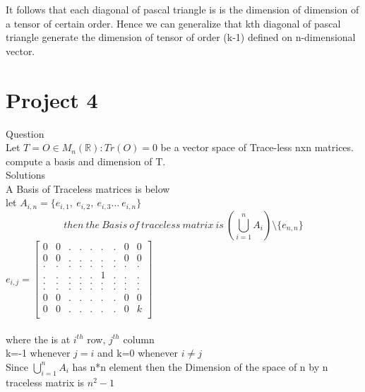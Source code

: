 \documentclass[45pt]{article}
\begin{document}
It follows that each diagonal of pascal triangle is is the dimension of dimension of a tensor of certain order. 
Hence we can generalize that kth diagonal of pascal triangle generate the dimension of tensor of order (k-1) defined on n-dimensional vector.
\vspace{6.0cm}

\section*{\Huge{Project 4}}
\Large{Question}\\
Let $T={O \in M_n(\mathbb{R}) :Tr(O)=0 }$ be a vector space of Trace-less nxn matrices. compute a basis and dimension of T.\\
    
\Large{Solutions}\\
A Basis of Traceless matrices is below\\
let $A_{i,n}=\{e_{i,1},~ e_{i,2},~e_{i,3}...~e_{i,n}\}$\\
$$then~ the ~Basis~of ~traceless ~matrix ~ is ~ ( \bigcup_{i=1}^{n} A_i) \setminus \{e_{n,n}\}   $$
 $e_{i,j}= \begin{bmatrix}
            0 &  0 &.&.&.& .& .& 0 &0\\
 0 &  0 &.&.&.& .& .& 0 &0\\
 .&.&.&.&.&.&.&.&.\\
 .&.&.&.&.&1&.&.&.\\
 .&.&.&.&.&.&.&.&.\\
 .&.&.&.&.&.&.&.&.\\
 0 & 0  &.&.&.& .& .&0& 0\\
 0 & 0  &.&.&.& .& .&0& k\\
            \end{bmatrix}$ \\\\
where the  is at $i^{th}$ row, $j^{th}$ column \\
k=-1 whenever $j=i $ and k=0  whenever $i \neq j$\\
Since $\bigcup_{i=1}^{n} A_i $ has n*n element then 
the Dimension of the space of  n by n traceless matrix  is 
\textbf{$n^2-1$}
\vspace{7cm}
\end{document}
